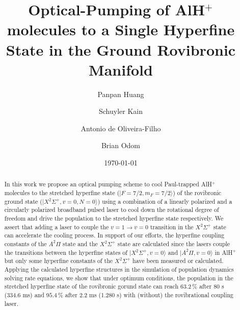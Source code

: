 \documentclass[nofootinbib,aip,jcp,reprint]{revtex4-1}
\begin{document}
\title{Optical-Pumping of AlH$^+$ molecules to a Single Hyperﬁne State in the Ground Rovibronic Manifold}

\author{Panpan Huang}

\author{Schuyler Kain}

\author{Antonio de Oliveira-Filho}

\author{Brian Odom}

\date{\today}

\begin{abstract}
In this work we propose an optical pumping scheme to cool Paul-trapped AlH$^+$ molecules to the stretched hyperfine state ($\lvert F=7/2, m_F=7/2\rangle$) of the rovibronic ground state ($\lvert X^2\Sigma^+, v=0, N=0\rangle$) using a combination of a linearly polarized and a circularly polarized broadband pulsed laser to cool down the rotational degree of freedom and drive the population to the stretched hyperfine state respectively. We assert that adding a laser to couple the $v=1 \rightarrow v=0$ transition in the  $ X^2\Sigma^+$ state can accelerate the cooling process. In support of our efforts, the hyperfine coupling constants of the $A^2\Pi$ state and the $X^2\Sigma^+$ state are calculated since the lasers couple the transitions between the hyperfine states of $\lvert X^2\Sigma^+, v=0\rangle$ and $\lvert A^{2}\Pi, v=0\rangle$ in AlH$^+$ but only some hyperfine constants of the $X^{2}\Sigma^+$ have been measured or calculated. Applying the calculated hyperfine structures in the simulation of population dynamics solving rate equations, we show that under optimum conditions, the population in the stretched hyperfine state of the rovibronic gorund state can reach $63.2\, \%$ after 80 {\micro}s (334.6 ms) and $95.4\, \%$ after 2.2 ms (1.280 s) with (without) the rovibrational coupling laser.
\end{abstract}

\maketitle
\end{document}
